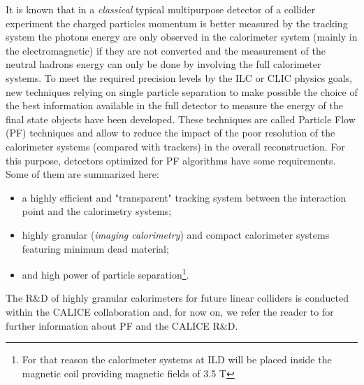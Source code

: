 \documentclass[final,3p,times,twocolumn]{elsarticle}
\begin{document}
It is known that in a {\it classical} typical multipurpose detector
of a collider experiment the charged particles momentum is better measured by the tracking system
the photons energy are only observed in the calorimeter system (mainly in the electromagnetic) if they are not converted
and the measurement of the neutral hadrons energy can only be done by involving the full calorimeter systems.
To meet the required precision levels by the ILC or CLIC physics goals,
new techniques relying on single particle separation to make possible the choice of the best information available
in the full detector to measure the energy of the final state objects have been developed.
These techniques are called Particle Flow (PF) techniques \cite{Brient:2002gh,Morgunov:2004ed,Sefkow:2015hna}
and allow to reduce the impact of the poor resolution of the calorimeter systems (compared with trackers) in the overall reconstruction.
For this purpose, detectors optimized for PF algorithms have some requirements. Some of them are summarized here:

\begin{itemize}
\item a highly efficient and "transparent" tracking system between the interaction point and the calorimetry systems;
\item highly granular ({\it imaging calorimetry}) and compact calorimeter systems featuring minimum dead material;
\item and high power of particle separation\footnote{
For that reason the calorimeter systems at ILD will be placed inside the magnetic coil
providing magnetic fields of 3.5 T}.
\end{itemize}

The R\&D of highly granular calorimeters for future linear colliders is conducted within the CALICE collaboration and, for now on, we refer the reader to \cite{Sefkow:2015hna} for further information about PF and the CALICE R\&D.
\end{document}
